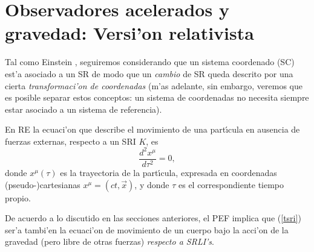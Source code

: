 \section{Observadores acelerados y gravedad: Versi'on  relativista}

Tal como Einstein \cite{Einstein56}, seguiremos considerando que un sistema coordenado (SC) est'a asociado a un SR de modo que un \textit{cambio} de SR queda descrito por una cierta \textit{transformaci'on de  coordenadas} (m'as adelante, sin embargo, veremos que es posible separar estos conceptos: un sistema de coordenadas no necesita siempre estar asociado a un sistema de referencia).

En RE la ecuaci'on que describe el movimiento de una part{\'\i}cula
en ausencia de fuerzas externas, respecto a un SRI $K$, es
\begin{equation}
\frac{d^2x^\mu}{d\tau ^2}=0, \label{tsri}
\end{equation}
donde $x^\mu(\tau )$ es la trayectoria de la part{\'\i}cula,
expresada en coordenadas (pseudo-)cartesianas $x^\mu=(ct,\vec{x})$, y donde $\tau $ es el correspondiente tiempo propio.

De acuerdo a lo discutido en las secciones anteriores, el PEF implica que (\ref{tsri}) ser'a tambi'en la ecuaci'on de movimiento de un cuerpo bajo la acci'on de la gravedad (pero libre de otras fuerzas) \textit{respecto a SRLI's}.

